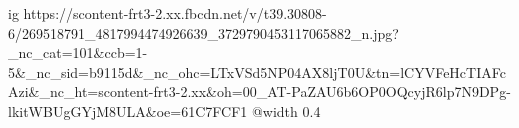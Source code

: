  
 
 
 
 

\ifcmt
  ig https://scontent-frt3-2.xx.fbcdn.net/v/t39.30808-6/269518791_4817994474926639_3729790453117065882_n.jpg?_nc_cat=101&ccb=1-5&_nc_sid=b9115d&_nc_ohc=LTxVSd5NP04AX8ljT0U&tn=lCYVFeHcTIAFcAzi&_nc_ht=scontent-frt3-2.xx&oh=00_AT-PaZAU6b6OP0OQcyjR6lp7N9DPg-lkitWBUgGYjM8ULA&oe=61C7FCF1
  @width 0.4
\fi
